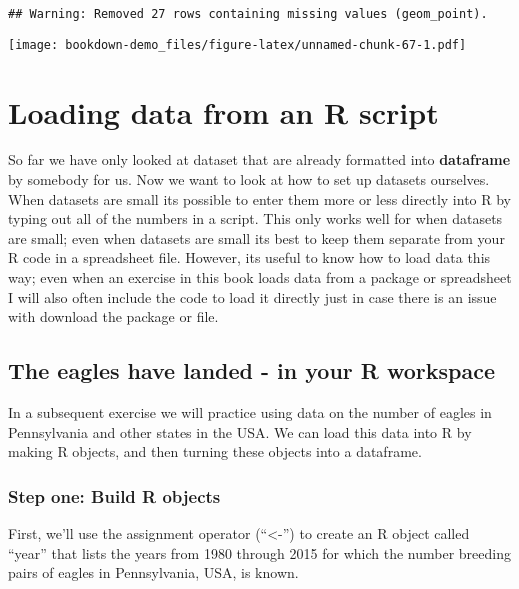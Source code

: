 \documentclass[]{book}
\theoremstyle{definition}
\theoremstyle{definition}
\theoremstyle{definition}
\theoremstyle{remark}
\begin{document}
\begin{verbatim}
## Warning: Removed 27 rows containing missing values (geom_point).
\end{verbatim}

\texttt{[image: bookdown-demo\_files/figure-latex/unnamed-chunk-67-1.pdf]}

\section{Loading data from an R
script}\label{loading-data-from-an-r-script}

So far we have only looked at dataset that are already formatted into
\textbf{dataframe} by somebody for us. Now we want to look at how to set
up datasets ourselves. When datasets are small its possible to enter
them more or less directly into R by typing out all of the numbers in a
script. This only works well for when datasets are small; even when
datasets are small its best to keep them separate from your R code in a
spreadsheet file. However, its useful to know how to load data this way;
even when an exercise in this book loads data from a package or
spreadsheet I will also often include the code to load it directly just
in case there is an issue with download the package or file.

\subsection{The eagles have landed - in your R
workspace}\label{the-eagles-have-landed---in-your-r-workspace}

In a subsequent exercise we will practice using data on the number of
eagles in Pennsylvania and other states in the USA. We can load this
data into R by making R objects, and then turning these objects into a
dataframe.

\subsubsection{Step one: Build R
objects}\label{step-one-build-r-objects}

First, we'll use the assignment operator (``\textless{}-'') to create an
R object called ``year'' that lists the years from 1980 through 2015 for
which the number breeding pairs of eagles in Pennsylvania, USA, is
known.
\end{document}
